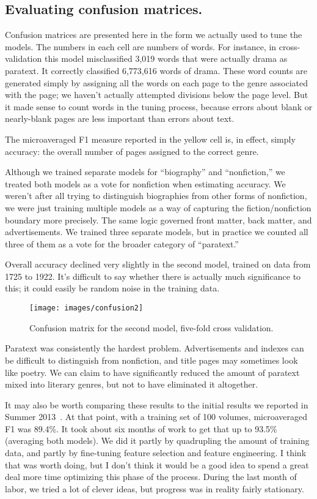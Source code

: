 \documentclass[paper=a4, fontsize=12pt]{scrartcl}
\numberwithin{equation}{section}		%
\numberwithin{figure}{section}			%
\numberwithin{table}{section}				%
\begin{document}
\subsection{Evaluating confusion matrices.}
Confusion matrices are presented here in the form we actually used to tune the models. The numbers in each cell are numbers of words. For instance, in cross-validation this model misclassified 3,019 words that were actually drama as paratext. It correctly classified 6,773,616 words of drama. These word counts are generated simply by assigning all the words on each page to the genre associated with the page; we haven't actually attempted divisions below the page level. But it made sense to count words in the tuning process, because errors about blank or nearly-blank pages are less important than errors about text.

The microaveraged F1 measure reported in the yellow cell is, in effect, simply accuracy: the overall number of pages assigned to the correct genre.

Although we trained separate models for ``biography'' and ``nonfiction,'' we treated both models as a vote for nonfiction when estimating accuracy. We weren't after all trying to distinguish biographies from other forms of nonfiction, we were just training multiple models as a way of capturing the fiction/nonfiction boundary more precisely. The same logic governed front matter, back matter, and advertisements. We trained three separate models, but in practice we counted all three of them as a vote for the broader category of ``paratext.''

Overall accuracy declined very slightly in the second model, trained on data from 1725 to 1922. It's difficult to say whether there is actually much significance to this; it could easily be random noise in the training data.

\begin{figure}[!h]
\centering
\texttt{[image: images/confusion2]}
\caption{Confusion matrix for the second model, five-fold cross validation.}
\label{confusion2}
\end{figure}

Paratext was consistently the hardest problem. Advertisements and indexes can be difficult to distinguish from nonfiction, and title pages may sometimes look like poetry. We can claim to have significantly reduced the amount of paratext mixed into literary genres, but not to have eliminated it altogether.

It may also be worth comparing these results to the initial results we reported in Summer 2013~\cite{underwood:mutable}. At that point, with a training set of 100 volumes, microaveraged F1 was 89.4\%. It took about six months of work to get that up to 93.5\% (averaging both models). We did it partly by quadrupling the amount of training data, and partly by fine-tuning feature selection and feature engineering. I think that was worth doing, but I don't think it would be a good idea to spend a great deal more time optimizing this phase of the process. During the last month of labor, we tried a lot of clever ideas, but progress was in reality fairly stationary.
\end{document}
